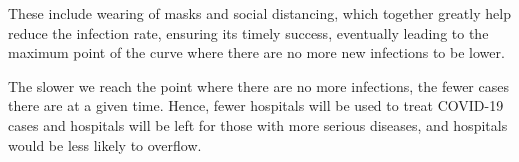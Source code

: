 \documentclass[a4paper,titlepage]{article}
\begin{document}
These include wearing of masks and social distancing, which together greatly help reduce the infection rate, ensuring its timely success, eventually leading to the maximum point of the curve where there are no more new infections to be lower.

The slower we reach the point where there are no more infections, the fewer cases there are at a given time. Hence, fewer hospitals will be used to treat COVID-19 cases and hospitals will be left for those with more serious diseases, and hospitals would be less likely to overflow.

\pagebreak


\end{document}
